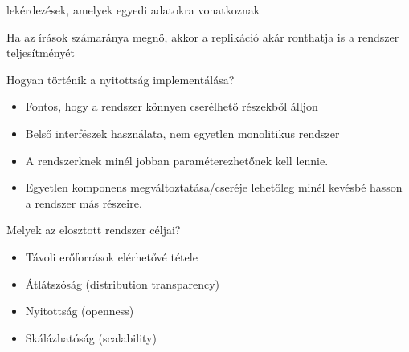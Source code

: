\documentclass[12pt]{article}
\begin{document}
\begin{description}
                                                                        lekérdezések, amelyek egyedi adatokra vonatkoznak
                                                                    \item Ha az írások számaránya megnő, akkor a replikáció akár ronthatja is a rendszer teljesítményét 
                                                                        \color{clrNonExam}
                                                                    \item Hogyan történik a nyitottság implementálása?
                                                                        \begin{itemize}
                                                                            \item Fontos, hogy a rendszer könnyen cserélhető részekből álljon
                                                                            \item Belső interfészek használata, nem egyetlen monolitikus rendszer
                                                                            \item A rendszerknek minél jobban paraméterezhetőnek kell lennie.
                                                                            \item Egyetlen komponens megváltoztatása/cseréje lehetőleg minél
                                                                                kevésbé hasson a rendszer más részeire.
                                                                        \end{itemize}
                                                                    \item Melyek az elosztott rendszer céljai?
                                                                        \begin{itemize}
                                                                            \item Távoli erőforrások elérhetővé tétele
                                                                            \item Átlátszóság (distribution transparency)
                                                                            \item Nyitottság (openness)
                                                                            \item Skálázhatóság (scalability)
                                                                        \end{itemize}

\end{description}
\end{document}
